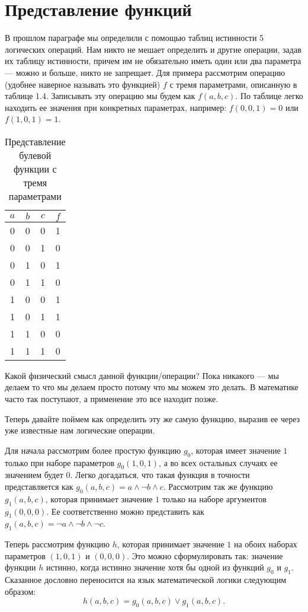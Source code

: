 \section{Представление функций}

В прошлом параграфе мы определили с помощью таблиц истинности 5 логических операций. Нам никто не мешает определить и другие операции, задав их таблицу истинности, причем им не обязательно иметь один или два параметра — можно и больше, никто не запрещает. Для примера рассмотрим операцию (удобнее наверное называть это функцией) $f$ с тремя параметрами, описанную в таблице 1.4. Записывать эту операцию мы будем как $f(a, b, c)$. По таблице легко находить ее значения при конкретных параметрах, например: $f(0,0,1) = 0$ или $f(1,0,1) = 1$.

\begin{table}[h]
\centering
\begin{tabular}{ccc|c}
$a$&$b$&$c$&$f$\\
\hline
0&0&0&1\\
0&0&1&0\\
0&1&0&1\\
0&1&1&0\\
1&0&0&1\\
1&0&1&1\\
1&1&0&0\\
1&1&1&0
\end{tabular}
\caption{Представление булевой функции с тремя параметрами}
\end{table}

Какой физический смысл данной функции/операции? Пока никакого — мы делаем то что мы делаем просто потому что мы можем это делать. В математике часто так поступают, а применение это все находит позже.

Теперь давайте поймем как определить эту же самую функцию, выразив ее через уже известные нам логические операции.

Для начала рассмотрим более простую функцию $g_0$, которая имеет значение $1$ только при наборе параметров $g_0(1, 0, 1)$, а во всех остальных случаях ее значением будет $0$. Легко догадаться, что такая функция в точности представляется как $g_0(a, b, c) = a\land \neg b \land c$. Рассмотрим так же функцию $g_1(a, b, c)$, которая принимает значение $1$ только на наборе аргументов $g_1(0, 0, 0)$. Ее соответственно можно представить как $g_1(a, b, c) = \neg a \land \neg b \land \neg c$.

Теперь рассмотрим функцию $h$, которая принимает значение $1$ на обоих наборах параметров $(1, 0, 1)$ и $(0, 0, 0)$. Это можно сформулировать так:   значение функции $h$ истинно, когда истинно значение хотя бы одной из функций $g_0$ и $g_1$. Сказанное дословно переносится на язык математической логики следующим образом: $$h(a, b, c) = g_0(a, b, c) \lor g_1(a, b, c).$$

